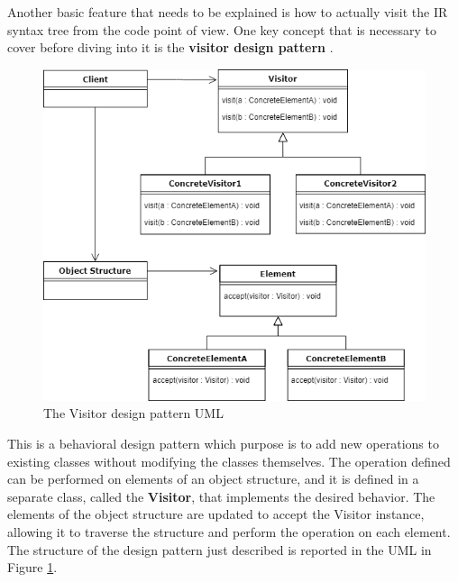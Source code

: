 Another basic feature that needs to be explained is how to actually visit the IR syntax tree from the code point of view. One key concept that is necessary to cover before diving into it is the \textbf{visitor design pattern} \cite{visitor_design_pattern}.
\begin{figure}[!ht]
    \centering
    \includegraphics[scale=0.6]{document/chapters/2-metaprogramming/images/visitor_pattern_uml.png}
    \caption{The Visitor design pattern UML \cite{visitor_design_pattern}}
    \label{fig:visitor_uml}
\end{figure}
This is a behavioral design pattern which purpose is to add new operations to existing classes without modifying the classes themselves. 
The operation defined can be performed on elements of an object structure, and it is defined in a separate class, called the \textbf{Visitor}, that implements the desired behavior. The elements of the object structure are updated to accept the Visitor instance, allowing it to traverse the structure and perform the operation on each element. The structure of the design pattern just described is reported in the UML in Figure \ref{fig:visitor_uml}.

